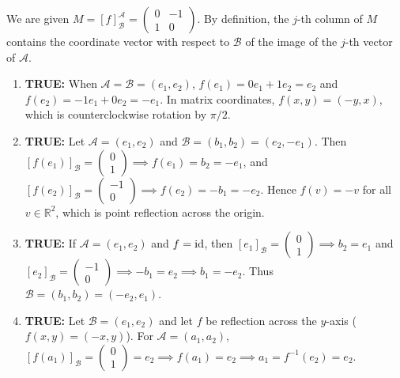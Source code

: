 \begin{exercisesolution*}
\label{sol:geometric_interpretation_matrix_mc}
We are given $M = [f]_{\mathcal{B}}^{\mathcal{A}} = \left(\begin{smallmatrix} 0 & -1 \\ 1 & 0 \end{smallmatrix}\right)$. By definition, the $j$-th column of $M$ contains the coordinate vector with respect to $\mathcal{B}$ of the image of the $j$-th vector of $\mathcal{A}$.

\begin{enumerate}[label=\textbf{(\alph*)}]
    \item \textbf{TRUE:} When $\mathcal{A} = \mathcal{B} = (e_1, e_2)$, $f(e_1) = 0 e_1 + 1 e_2 = e_2$ and $f(e_2) = -1 e_1 + 0 e_2 = -e_1$. In matrix coordinates, $f(x, y) = (-y, x)$, which is counterclockwise rotation by $\pi/2$.
    \item \textbf{TRUE:} Let $\mathcal{A} = (e_1, e_2)$ and $\mathcal{B} = (b_1, b_2) = (e_2, -e_1)$.
    Then $[f(e_1)]_{\mathcal{B}} = \left(\begin{smallmatrix} 0 \\ 1 \end{smallmatrix}\right) \implies f(e_1) = b_2 = -e_1$, and $[f(e_2)]_{\mathcal{B}} = \left(\begin{smallmatrix} -1 \\ 0 \end{smallmatrix}\right) \implies f(e_2) = -b_1 = -e_2$.
    Hence $f(v) = -v$ for all $v \in \mathbb{R}^2$, which is point reflection across the origin.
    \item \textbf{TRUE:} If $\mathcal{A} = (e_1, e_2)$ and $f = \operatorname{id}$, then $[e_1]_{\mathcal{B}} = \left(\begin{smallmatrix} 0 \\ 1 \end{smallmatrix}\right) \implies b_2 = e_1$ and $[e_2]_{\mathcal{B}} = \left(\begin{smallmatrix} -1 \\ 0 \end{smallmatrix}\right) \implies -b_1 = e_2 \implies b_1 = -e_2$.
    Thus $\mathcal{B} = (b_1, b_2) = (-e_2, e_1)$.
    \item \textbf{TRUE:} Let $\mathcal{B} = (e_1, e_2)$ and let $f$ be reflection across the $y$-axis ($f(x, y) = (-x, y)$).
    For $\mathcal{A} = (a_1, a_2)$, $[f(a_1)]_{\mathcal{B}} = \left(\begin{smallmatrix} 0 \\ 1 \end{smallmatrix}\right) = e_2 \implies f(a_1) = e_2 \implies a_1 = f^{-1}(e_2) = e_2$.

\end{enumerate}
\end{exercisesolution*}
